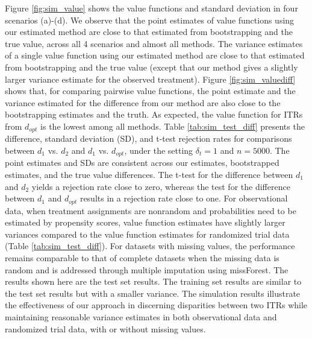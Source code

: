 \documentclass{article}
\begin{document}
Figure \ref{fig:sim_value} shows the value functions and standard deviation in four scenarios (a)-(d). We observe that the point estimates of value functions using our estimated method are close to that estimated from bootstrapping and the true value, across all 4 scenarios and almost all methods. The variance estimates of a single value function using our estimated method are close to that estimated from bootstrapping and the true value (except that our method gives a slightly larger variance estimate for the observed treatment). Figure \ref{fig:sim_valuediff} shows that, for comparing pairwise value functions, the point estimate and the variance estimated for the difference from our method are also close to the bootstrapping estimates and the truth. As expected, the value function for ITRs from $d_{opt}$ is the lowest among all methods. Table \ref{tab:sim_test_diff} presents the difference, standard deviation (SD), and t-test rejection rates for comparisons between $d_1$ vs. $d_2$ and $d_1$ vs. $d_{opt}$, under the setting $\delta_t = 1$ and $n=5000$. The point estimates and SDs are consistent across our estimates, bootstrapped estimates, and the true value differences. The t-test for the difference between $d_1$ and $d_2$ yields a rejection rate close to zero, whereas the test for the difference between $d_1$  and $d_{opt}$ results in a rejection rate close to one. For observational data, when treatment assignments are nonrandom and probabilities need to be estimated by propensity scores, value function estimates have slightly larger variances compared to the value function estimates for randomized trial data (Table \ref{tab:sim_test_diff}). For datasets with missing values, the performance remains comparable to that of complete datasets when the missing data is random and is addressed through multiple imputation using missForest. The results shown here are the test set results. The training set results are similar to the test set results but with a smaller variance. The simulation results illustrate the effectiveness of our approach in discerning disparities between two ITRs while maintaining reasonable variance estimates in both observational data and randomized trial data, with or without missing values. 
\end{document}
